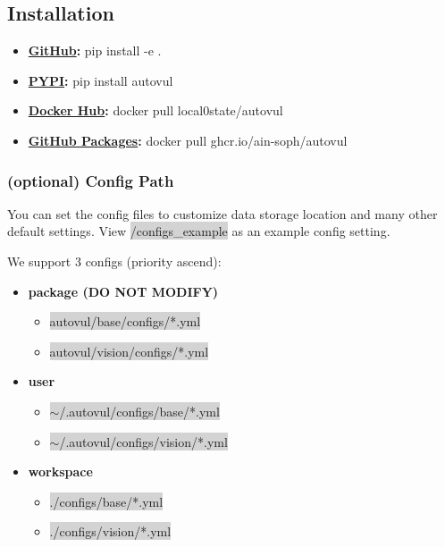 \documentclass[letterpaper,twocolumn,10pt]{article}
\begin{document}
{{%
\subsection{Installation}

{\small
\begin{itemize}
    \item {\bf \href{https://github.com/ain-soph/autovul}{GitHub}: } pip install -e .
    \item {\bf \href{https://pypi.org/project/autovul/}{PYPI}: } pip install autovul
    \item {\bf \href{https://hub.docker.com/r/local0state/autovul}{Docker Hub}: } docker pull local0state/autovul
    \item {\bf \href{https://github.com/ain-soph/autovul/pkgs/container/autovul}{GitHub Packages}: } docker pull ghcr.io/ain-soph/autovul
\end{itemize}

\subsubsection*{(optional) Config Path}
You can set the config files to customize data storage location and many other default settings. View \colorbox{lightgray}{/configs\_example} as an example config setting.

We support 3 configs (priority ascend):

{\small
\begin{itemize}
    \item {\bf package (DO NOT MODIFY)}
          \begin{itemize}
              \item \colorbox{lightgray}{autovul/base/configs/*.yml}
              \item \colorbox{lightgray}{autovul/vision/configs/*.yml}
          \end{itemize}
    \item {\bf user}
          \begin{itemize}
              \item \colorbox{lightgray}{$\sim$/.autovul/configs/base/*.yml}
              \item \colorbox{lightgray}{$\sim$/.autovul/configs/vision/*.yml}
          \end{itemize}
    \item {\bf workspace}
          \begin{itemize}
              \item \colorbox{lightgray}{./configs/base/*.yml}
              \item \colorbox{lightgray}{./configs/vision/*.yml}
          \end{itemize}
\end{itemize}

}}}}
\end{document}
